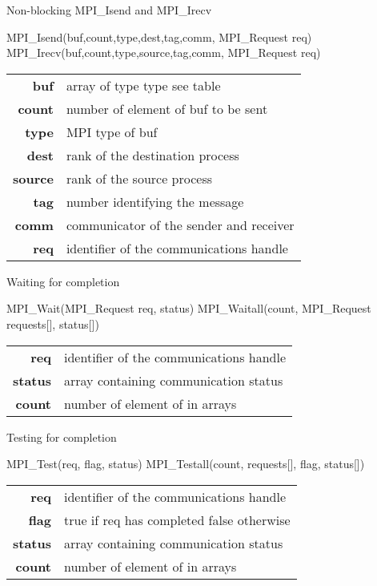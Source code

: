 \documentclass[aspectratio=43]{beamer}
\begin{document}
\begin{frame}[fragile]{Non-blocking MPI\_Isend and MPI\_Irecv}
\begin{Pseudolisting}[]{}
MPI_Isend(buf,count,type,dest,tag,comm, MPI_Request req)
MPI_Irecv(buf,count,type,source,tag,comm, MPI_Request req)
\end{Pseudolisting}
\begin{black1block}{}
\begin{tabular}{rl}
    \textbf{buf} & array of type type see table\\
    \textbf{count} & number of element of buf to be sent\\
    \textbf{type} & MPI type of buf\\
    \textbf{dest} & rank of the destination process\\
    \textbf{source} & rank of the source process\\
    \textbf{tag} & number identifying the message\\
    \textbf{comm} & communicator of the sender and receiver\\
    \textbf{req} &  identifier of the communications handle\\
\end{tabular}
\end{black1block}
\end{frame}

\begin{frame}[fragile]{Waiting for completion}
\begin{Pseudolisting}[]{}
MPI_Wait(MPI_Request req, status)
MPI_Waitall(count, MPI_Request requests[], status[])
\end{Pseudolisting}
\begin{black1block}{}
\begin{tabular}{rl}
    \textbf{req} & identifier of the communications handle\\
    \textbf{status} & array containing communication status\\
    \textbf{count} & number of element of in arrays\\
\end{tabular}
\end{black1block}
\end{frame}

\begin{frame}[fragile]{Testing for completion}
\begin{Pseudolisting}[]{}
MPI_Test(req, flag, status)
MPI_Testall(count, requests[], flag, status[])
\end{Pseudolisting}
\begin{black1block}{}
\begin{tabular}{rl}
    \textbf{req} & identifier of the communications handle\\
    \textbf{flag} & true if req has completed false otherwise\\
    \textbf{status} & array containing communication status\\
    \textbf{count} & number of element of in arrays\\
\end{tabular}
\end{black1block}
\end{frame}
\end{document}
